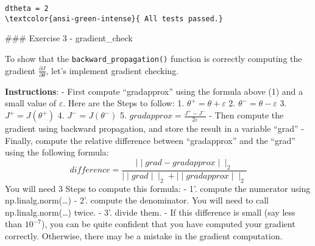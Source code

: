 \documentclass[11pt]{article}
\begin{document}
    \begin{Verbatim}[commandchars=\\\{\}]
dtheta = 2
\textcolor{ansi-green-intense}{ All tests passed.}
    \end{Verbatim}

    \#\#\# Exercise 3 - gradient\_check

To show that the \texttt{backward\_propagation()} function is correctly
computing the gradient \(\frac{\partial J}{\partial \theta}\), let's
implement gradient checking.

\textbf{Instructions}: - First compute ``gradapprox'' using the formula
above (1) and a small value of \(\varepsilon\). Here are the Steps to
follow: 1. \(\theta^{+} = \theta + \varepsilon\) 2.
\(\theta^{-} = \theta - \varepsilon\) 3. \(J^{+} = J(\theta^{+})\) 4.
\(J^{-} = J(\theta^{-})\) 5.
\(gradapprox = \frac{J^{+} - J^{-}}{2 \varepsilon}\) - Then compute the
gradient using backward propagation, and store the result in a variable
``grad'' - Finally, compute the relative difference between
``gradapprox'' and the ``grad'' using the following formula:
\[ difference = \frac {\mid\mid grad - gradapprox \mid\mid_2}{\mid\mid grad \mid\mid_2 + \mid\mid gradapprox \mid\mid_2} \tag{2}\]
You will need 3 Steps to compute this formula: - 1'. compute the
numerator using np.linalg.norm(\ldots) - 2'. compute the denominator.
You will need to call np.linalg.norm(\ldots) twice. - 3'. divide them. -
If this difference is small (say less than \(10^{-7}\)), you can be
quite confident that you have computed your gradient correctly.
Otherwise, there may be a mistake in the gradient computation.
\end{document}
